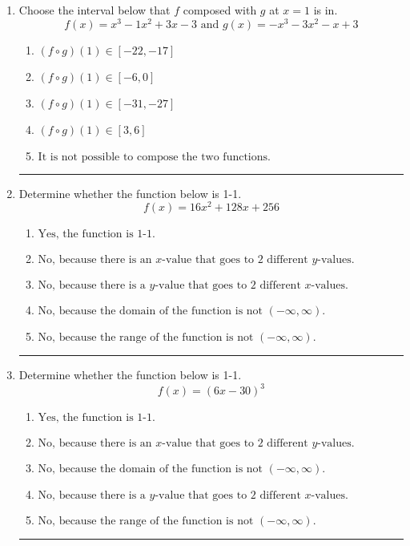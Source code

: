 \documentclass[14pt]{extbook}
\newcommand{\litem}[1]{\item#1\hspace*{-1cm}\rule{\textwidth}{0.4pt}}
\begin{document}
\begin{enumerate}
\litem{
Choose the interval below that $f$ composed with $g$ at $x=1$ is in.\[ f(x) = x^{3} -1 x^{2} +3 x -3 \text{ and } g(x) = -x^{3} -3 x^{2} -x + 3 \]\begin{enumerate}[label=\Alph*.]
\item \( (f \circ g)(1) \in [-22, -17] \)
\item \( (f \circ g)(1) \in [-6, 0] \)
\item \( (f \circ g)(1) \in [-31, -27] \)
\item \( (f \circ g)(1) \in [3, 6] \)
\item \( \text{It is not possible to compose the two functions.} \)

\end{enumerate} }
\litem{
Determine whether the function below is 1-1.\[ f(x) = 16 x^2 + 128 x + 256 \]\begin{enumerate}[label=\Alph*.]
\item \( \text{Yes, the function is 1-1.} \)
\item \( \text{No, because there is an $x$-value that goes to 2 different $y$-values.} \)
\item \( \text{No, because there is a $y$-value that goes to 2 different $x$-values.} \)
\item \( \text{No, because the domain of the function is not $(-\infty, \infty)$.} \)
\item \( \text{No, because the range of the function is not $(-\infty, \infty)$.} \)

\end{enumerate} }
\litem{
Determine whether the function below is 1-1.\[ f(x) = (6 x - 30)^3 \]\begin{enumerate}[label=\Alph*.]
\item \( \text{Yes, the function is 1-1.} \)
\item \( \text{No, because there is an $x$-value that goes to 2 different $y$-values.} \)
\item \( \text{No, because the domain of the function is not $(-\infty, \infty)$.} \)
\item \( \text{No, because there is a $y$-value that goes to 2 different $x$-values.} \)
\item \( \text{No, because the range of the function is not $(-\infty, \infty)$.} \)


\end{enumerate}}
\end{enumerate}
\end{document}
